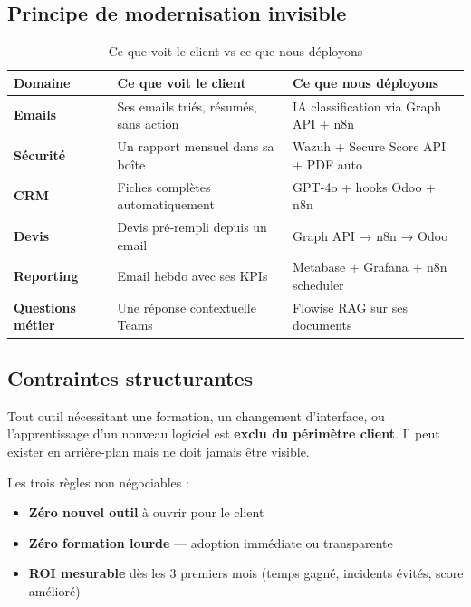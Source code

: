 \subsection{Principe de modernisation invisible}

\begin{table}[htbp]
  \centering
  \caption{Ce que voit le client vs ce que nous déployons}
  \renewcommand{\arraystretch}{1.4}
  \begin{tabularx}{\textwidth}{>{\bfseries}l X X}
    \toprule
    \rowcolor{tabheader}
    \color{white}Domaine & \color{white}Ce que voit le client & \color{white}Ce que nous déployons \\
    \midrule
    Emails & Ses emails triés, résumés, sans action & IA classification via Graph API + n8n \\
    \rowcolor{rowgray}
    Sécurité & Un rapport mensuel dans sa boîte & Wazuh + Secure Score API + PDF auto \\
    CRM & Fiches complètes automatiquement & GPT-4o + hooks Odoo + n8n \\
    \rowcolor{rowgray}
    Devis & Devis pré-rempli depuis un email & Graph API → n8n → Odoo \\
    Reporting & Email hebdo avec ses KPIs & Metabase + Grafana + n8n scheduler \\
    \rowcolor{rowgray}
    Questions métier & Une réponse contextuelle Teams & Flowise RAG sur ses documents \\
    \bottomrule
  \end{tabularx}
\end{table}

\subsection{Contraintes structurantes}

\begin{attention}
  Tout outil nécessitant une formation, un changement d'interface, ou l'apprentissage d'un nouveau logiciel est \textbf{exclu du périmètre client}. Il peut exister en arrière-plan mais ne doit jamais être visible.
\end{attention}

Les trois règles non négociables :
\begin{itemize}
  \item \textbf{Zéro nouvel outil} à ouvrir pour le client
  \item \textbf{Zéro formation lourde} — adoption immédiate ou transparente
  \item \textbf{ROI mesurable} dès les 3 premiers mois (temps gagné, incidents évités, score amélioré)
\end{itemize}
